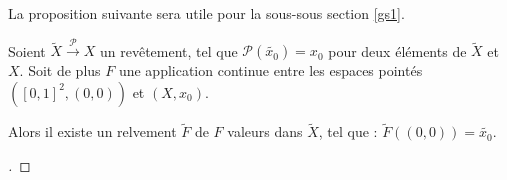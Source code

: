 \begin{comment}
L'existence s'\'etablit avec le lemme de Zorn : FAUX, il faut une hypothèse additionnelle biscornue,pour avoir desintersections connexes d'ouverts de relèvement.
C-exemple : on ne peut pas relever sur \mathbb{R} l'application identti\'e de \mathbb{U} dans lui-m\^eme, via l'exponentielle complexe, après un choix d'image pour un point de  cette sphère.

\begin{prop}
Avec les hypoth\`eses de la proposition qui pr\'ec\`ede concernant $f$, $z_0$ et $x_0$, il existe (au moins) une application continue $\tilde{f}$ de $Z$ vers $P$, %
qui vaut $\tilde{x_0}$ en $z_0$, qui rel\`eve $f$ au sens o\`u :
\[\forall z\in Z, \mathcal{P}(\tilde{f}(z))=f(z)\]
\end{prop}

\begin{proof}[\es]
Rel\g{e}vements locaux, un rel\g{e}vement d\'efini sur un ouvert strictement inclus dans $Z$ n'est pas maximal.
\end{proof}

\end{comment}

La proposition suivante sera utile pour la sous-sous section \ref{gs1}.%

\begin{prop}\label{red2}
Soient $\tilde{X}\overset{\mathcal{P}}{\longrightarrow} X$ un rev\^etement, tel que $\mathcal{P}(\tilde{x_0})=x_0$ pour deux \'el\'ements de $\tilde{X}$ et $X$. %
Soit de plus $F$ une application continue entre les espaces point\'es $([0,1]^2,(0,0))$ et $(X,x_0)$.

\par
Alors il existe un relvement $\tilde{F}$ de $F$  valeurs dans $\tilde{X}$, tel que : $\tilde{F}((0,0))=\tilde{x_0}$.
\end{prop}

\begin{proof}[\re]
\end{proof}

